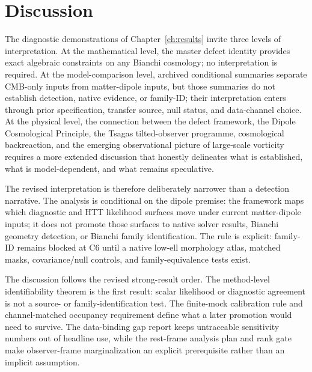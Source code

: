 
\chapter{Discussion}\label{ch:discussion}

The diagnostic demonstrations of Chapter~\ref{ch:results} invite three
levels of interpretation.  At the mathematical level, the
master defect identity provides exact algebraic constraints on
any Bianchi cosmology; no interpretation is required.  At the
model-comparison level, archived conditional summaries separate
CMB-only inputs from matter-dipole inputs, but those summaries do
not establish detection, native evidence, or family-ID;
their interpretation enters through prior specification, transfer
source, null status, and data-channel choice.  At the physical
level, the connection between the defect framework, the Dipole
Cosmological Principle, the Tsagas tilted-observer programme,
cosmological backreaction, and the emerging observational
picture of large-scale vorticity requires a more extended
discussion that honestly delineates what is established, what is
model-dependent, and what remains speculative.

The revised interpretation is therefore deliberately narrower than a
detection narrative.  The analysis is conditional on the dipole premise:
the framework
maps which diagnostic and HTT likelihood surfaces move under current
matter-dipole inputs; it does not promote those surfaces to native
solver results, Bianchi geometry detection, or Bianchi family
identification.  The rule is explicit: family-ID remains blocked
at C6 until a native low-ell morphology atlas, matched masks, covariance/null
controls, and family-equivalence tests exist.

The discussion follows the revised strong-result order.  The
method-level identifiability theorem is the first result: scalar
likelihood or diagnostic agreement is not a source- or
family-identification test.  The finite-mock calibration rule and
channel-matched occupancy requirement define what a later
promotion would need to survive.  The data-binding gap report
keeps untraceable sensitivity numbers out of headline use, while
the rest-frame analysis plan and rank gate make observer-frame
marginalization an explicit prerequisite rather than an implicit
assumption.


